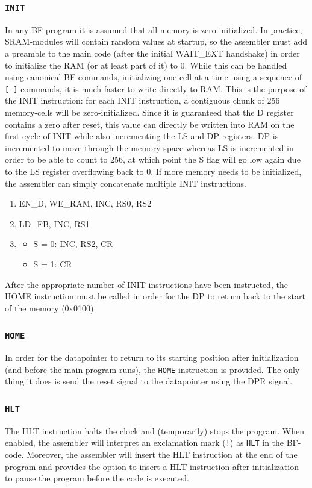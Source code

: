 \subsubsection{\texttt{INIT}} \label{sec:sequences:init}
In any BF program it is assumed that all memory is zero-initialized. In practice, SRAM-modules will contain random values at startup, so the assembler must add a preamble to the main code (after the initial WAIT\_EXT handshake) in order to initialize the RAM (or at least part of it) to 0. While this can be handled using canonical BF commands, initializing one cell at a time using a sequence of \texttt{[-]} commands, it is much faster to write directly to RAM. This is the purpose of the INIT instruction: for each INIT instruction, a contiguous chunk of 256 memory-cells will be zero-initialized. Since it is guaranteed that the D register contains a zero after reset, this value can directly be written into RAM on the first cycle of INIT while also incrementing the LS and DP registers. DP is incremented to move through the memory-space whereas LS is incremented in order to be able to count to 256, at which point the S flag will go low again due to the LS register overflowing back to 0. If more memory needs to be initialized, the assembler can simply concatenate multiple INIT instructions.
\begin{enumerate}
\item EN\_D, WE\_RAM, INC, RS0, RS2
\item LD\_FB, INC, RS1
\item
  \begin{itemize}
  \item S = 0: INC, RS2, CR
  \item S = 1: CR
  \end{itemize}
\end{enumerate}
After the appropriate number of INIT instructions have been instructed, the HOME instruction must be called in order for the DP to return back to the start of the memory (0x0100).

\subsubsection{\texttt{HOME}} \label{sec:sequences:home}
In order for the datapointer to return to its starting position after initialization (and before the main program runs), the \texttt{HOME} instruction is provided. The only thing it does is send the reset signal to the datapointer using the DPR signal.

\subsubsection{\texttt{HLT}}
The HLT instruction halts the clock and (temporarily) stops the program. When enabled, the assembler will interpret an exclamation mark (\texttt{!}) as \texttt{HLT} in the BF-code. Moreover, the assembler will insert the HLT instruction at the end of the program and provides the option to insert a HLT instruction after initialization to pause the program before the code is executed. 

